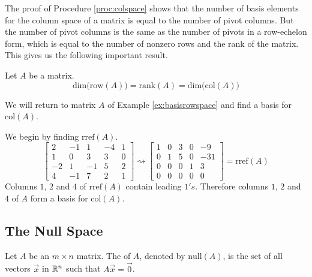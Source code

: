 \documentclass{ximera}
\begin{document}
The proof of Procedure \ref{proc:colspace} shows that the number of basis elements for the column space of a matrix is equal to the number of pivot columns.  But the number of pivot columns is the same as the number of pivots in a row-echelon form, which is equal to the number of nonzero rows and the rank of the matrix.  This gives us the following important result.
\begin{theorem}\label{th:dimroweqdimcoleqrank}
Let $A$ be a matrix.
$$\mbox{dim}\Big(\mbox{row}(A)\Big)=\mbox{rank}(A)=\mbox{dim}\Big(\mbox{col}(A)\Big)$$
\end{theorem}

\begin{example}\label{ex:basiscolspace}
We will return to matrix $A$ of Example \ref{ex:basisrowspace} and find a basis for $\mbox{col}(A)$.
\begin{explanation}
We begin by finding $\mbox{rref}(A)$.
$$\begin{bmatrix}2&-1&1&-4&1\\1&0&3&3&0\\-2&1&-1&5&2\\4&-1&7&2&1\end{bmatrix}\rightsquigarrow\begin{bmatrix}1&0&3&0&-9\\0&1&5&0&-31\\0&0&0&1&3\\0&0&0&0&0\end{bmatrix}=\mbox{rref}(A)$$
Columns $1$, $2$ and $4$ of $\mbox{rref}(A)$ contain leading $1's$.  Therefore columns $1$, $2$ and $4$ of $A$ form a basis for $\mbox{col}(A)$.
\end{explanation}

\end{example}

\subsection*{The Null Space}
\begin{definition}\label{def:nullspace} Let $A$ be an $m\times n$ matrix.  The  of $A$, denoted by $\mbox{null}(A)$, is the set of all vectors $\vec{x}$ in $\mathbb{R}^n$ such that $A\vec{x}=\vec{0}$.
\end{definition}
\end{document}
